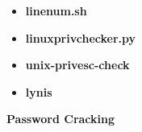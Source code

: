 \documentclass[a4paper,10pt]{article}
\begin{document}
\begin{multicols}{2}
\begin{tcolorbox}[breakable,title=Scripts]
\begin{itemize}
	\itemsep0em
	\item \textbf{linenum.sh}
	\item \textbf{linuxprivchecker.py}
	\item \textbf{unix-privesc-check}
	\item \textbf{lynis}
\end{itemize}
\end{tcolorbox}
\begin{tcolorbox}[breakable,title=Shell escape sequences]
	
\end{tcolorbox}
\begin{tcolorbox}[breakable,title=TTY upgrades]

\end{tcolorbox}

\end{multicols}
\newpage
\Huge{\textbf{Password Cracking}}
\newline
\normalsize
\end{document}
